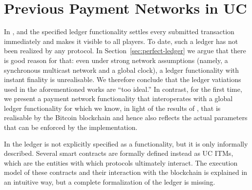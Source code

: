 \section{Previous Payment Networks in UC}
\label{sec:related-work}
  In \cite{DBLP:conf/ccs/DziembowskiFH18}, \cite{perun} and
  \cite{Malavolta:2017:CPP:3133956.3134096} the specified ledger functionality
  settles every submitted transaction immediately and makes it visible to all
  players. To date, such a ledger has not been realized by any protocol. In
  Section~\ref{sec:perfect-ledger} we argue that there is good reason for
  that: even under strong network assumptions (namely, a synchronous multicast
  network and a global clock), a ledger functionality with instant finality is
  unrealisable. We therefore conclude that the ledger vatiations used in the
  aforementioned works are ``too ideal.'' In contrast, for the first time, we
  present a payment network functionality that interoperates with a global
  ledger functionality for which we know, in light of the results of
  \cite{BMTZ17}, that is realisable by the Bitcoin blockchain and hence also
  reflects the actual parameters that can be enforced by the implementation.

  In \cite{sprites} the ledger is not explicitly specified as a functionality,
  but it is only informally described. Several smart contracts are formally
  defined instead as UC ITMs, which are the entities with which protocols
  ultimately interact. The execution model of these contracts and their
  interaction with the blockchain is explained in an intuitive way, but a
  complete formalization of the ledger is missing.
